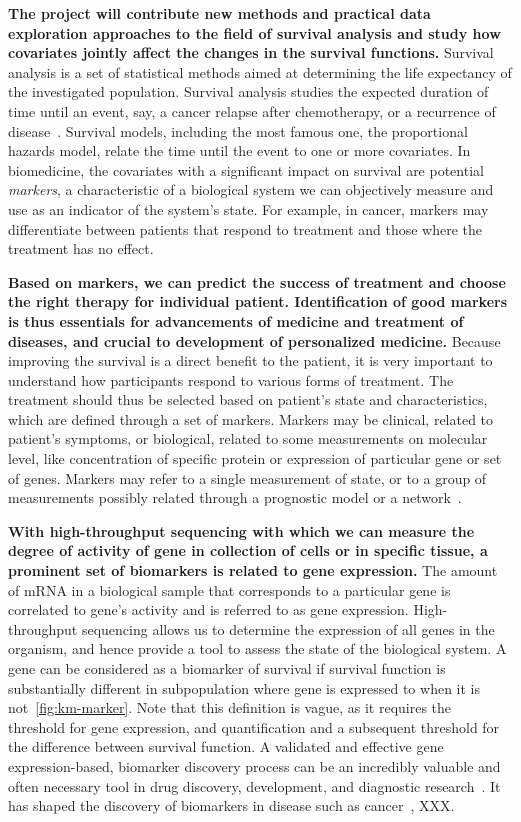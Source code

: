 \documentclass[11pt,a4paper]{article}
\renewcommand{\bold}{\textbf}
\begin{document}
\bold{The project will contribute new methods and practical data exploration approaches to the field of survival analysis and study how covariates jointly affect the changes in the survival functions.} Survival analysis is a set of statistical methods aimed at determining the life expectancy of the investigated population. Survival analysis studies the expected duration of time until an event, say, a cancer relapse after chemotherapy, or a recurrence of disease~\cite{pazdur2008endpoints}. Survival models, including the most famous one, the proportional hazards model, relate the time until the event to one or more covariates. In biomedicine, the covariates with a significant impact on survival are potential {\em markers}, a characteristic of a biological system we can objectively measure and use as an indicator of the system's state. For example, in cancer, markers may differentiate between patients that respond to treatment and those where the treatment has no effect. 

\bold{Based on markers, we can predict the success of treatment and choose the right therapy for individual patient. Identification of good markers is thus essentials for advancements of medicine and treatment of diseases, and crucial to development of personalized medicine.} Because improving the survival is a direct benefit to the patient, it is very important to understand how participants respond to various forms of treatment. The treatment should thus be selected based on patient's state and characteristics, which are defined through a set of markers. Markers may be clinical, related to patient's symptoms, or biological, related to some measurements on molecular level, like concentration of specific protein or expression of particular gene or set of genes. Markers may refer to a single measurement of state, or to a group of measurements possibly related through a prognostic model or a network~\cite{Sonawane2019}.

\bold{With high-throughput sequencing with which we can measure the degree of activity of gene in collection of cells or in specific tissue, a prominent set of biomarkers is related to gene expression.} The amount of mRNA in a biological sample that corresponds to a particular gene is correlated to gene's activity and is referred to as gene expression. High-throughput sequencing allows us to determine the expression of all genes in the organism, and hence provide a tool to assess the state of the biological system. A gene can be considered as a biomarker of survival if survival function is substantially different in subpopulation where gene is expressed to when it is not~\ref{fig:km-marker}. Note that this definition is vague, as it requires the threshold for gene expression, and quantification and a subsequent threshold for the difference between survival function. A validated and effective gene expression-based, biomarker discovery process can be an incredibly valuable and often necessary tool in drug discovery, development, and diagnostic research~\cite{MonforteMcPhail2005}. It has shaped the discovery of biomarkers in disease such as cancer~\cite{HENRY2012140}, XXX.
\end{document}
